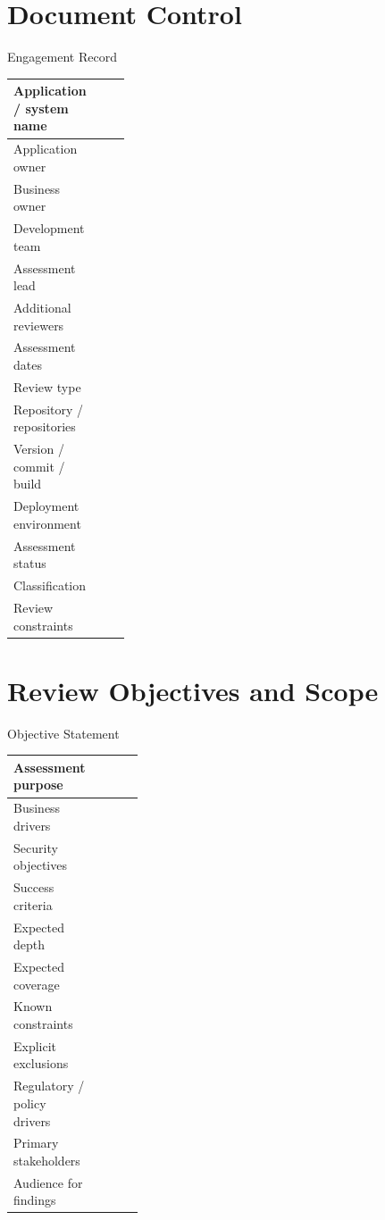 \documentclass[10pt]{article}
\begin{document}
\section{Document Control}
\begin{worksheetbox}{Engagement Record}
\par\smallskip\noindent\begin{tabularx}{\linewidth}{@{}L{0.26\linewidth}Y@{}}
Application / system name & \\ \midrule
Application owner & \\ \midrule
Business owner & \\ \midrule
Development team & \\ \midrule
Assessment lead & \\ \midrule
Additional reviewers & \\ \midrule
Assessment dates & \\ \midrule
Review type & \\ \midrule
Repository / repositories & \\ \midrule
Version / commit / build & \\ \midrule
Deployment environment & \\ \midrule
Assessment status & \\ \midrule
Classification & \\ \midrule
Review constraints & \\ 
\end{tabularx}
\end{worksheetbox}

\section{Review Objectives and Scope}
\begin{worksheetbox}{Objective Statement}
\par\smallskip\noindent\begin{tabularx}{\linewidth}{@{}L{0.29\linewidth}Y@{}}
Assessment purpose & \\ \midrule
Business drivers & \\ \midrule
Security objectives & \\ \midrule
Success criteria & \\ \midrule
Expected depth & \\ \midrule
Expected coverage & \\ \midrule
Known constraints & \\ \midrule
Explicit exclusions & \\ \midrule
Regulatory / policy drivers & \\ \midrule
Primary stakeholders & \\ \midrule
Audience for findings & \\ 
\end{tabularx}
\end{worksheetbox}
\end{document}
